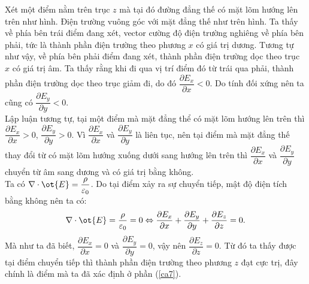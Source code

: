 \begin{loigiai}
\begin{enumerate}[1)]
\begin{center}
        \end{center}
        Xét một điểm nằm trên trục $z$ mà tại đó đường đẳng thế có mặt lõm hướng lên trên như hình. Điện trường vuông góc với mặt đẳng thế như trên hình. Ta thấy về phía bên trái điểm đang xét, vector cường độ điện trường nghiêng về phía bên phải, tức là thành phần điện trường theo phương $x$ có giá trị dương. Tương tự như vậy, về phía bên phải điểm đang xét, thành phần điện trường dọc theo trục $x$ có giá trị âm. Ta thấy rằng khi đi qua vị trí điểm đó từ trái qua phải, thành phần điện trường dọc theo trục giảm đi, do đó $\dfrac{\partial E_x}{\partial x}<0$. Do tính đối xứng nên ta cũng có $\dfrac{\partial E_y}{\partial y}<0$. \\
        Lập luận tương tự, tại một điểm mà mặt đẳng thể có mặt lõm hướng lên trên thì $\dfrac{\partial E_x}{\partial x}>0$, $\dfrac{\partial E_y}{\partial y}>0$. Vì $\dfrac{\partial E_x}{\partial x}$ và $\dfrac{\partial E_y}{\partial y}$ là liên tục, nên tại điểm mà mặt đẳng thế thay đổi từ có mặt lõm hướng xuống dưới sang hướng lên trên thì $\dfrac{\partial E_x}{\partial x}$ và $\dfrac{\partial E_y}{\partial y}$ chuyển từ âm sang dương và có giá trị bằng không.\\
        Ta có $\nabla\cdot \ot{E}=\dfrac{\rho}{\varepsilon_0}$. Do tại điểm xảy ra sự chuyển tiếp, mật độ điện tích bằng không nên ta có:
        \begin{equation}
            \nabla\cdot \ot{E}=\dfrac{\rho}{\varepsilon_0}=0\Leftrightarrow \dfrac{\partial E_x}{\partial x}+\dfrac{\partial E_y}{\partial y}+\dfrac{\partial E_z}{\partial z}=0.
        \end{equation}
        Mà như ta đã biết, $\dfrac{\partial E_x}{\partial x}=0$ và $\dfrac{\partial E_y}{\partial y}=0$, vậy nên $\dfrac{\partial E_z}{\partial z}=0$. Từ đó ta thấy được tại điểm chuyển tiếp thì thành phần điện trường theo phương $z$ đạt cực trị, đây chính là điểm mà ta đã xác định ở phần (\ref{ca7}).
    \end{enumerate}
    \end{loigiai}
  
